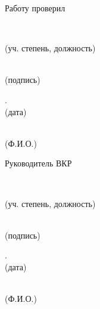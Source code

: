 \documentclass[14pt]{extarticle}
\begin{document}
\vspace{3em}
\noindent Работу проверил\\
\noindent
\makebox[0.0cm][l]{\underline{\hspace{\linewidth}}}%
\parbox[t]{5.4cm}{\\[-0.2em]%
{\centering\footnotesize (уч. степень, должность)\par}}%
\parbox[t]{4.0cm}{\centering \,\\[-0.2em] \footnotesize (подпись)\par}%
\parbox[t]{2.5cm}{.\the\year\\[-0.2em] \footnotesize (дата) \par}%
\parbox[t]{4.5cm}{\centering {}\\[-0.2em] \footnotesize (Ф.И.О.)\par}%

\vspace{3em}
\noindent Руководитель ВКР\\
\noindent
\makebox[0.0cm][l]{\underline{\hspace{\linewidth}}}%
\parbox[t]{5.4cm}{\\[-0.2em]%
{\centering\footnotesize (уч. степень, должность)\par}}%
\parbox[t]{4.0cm}{\, \\[-0.2em]\centering\footnotesize (подпись)\par}%
\parbox[t]{2.5cm}{.\the\year \\[-0.2em] \footnotesize (дата)\par}%
\parbox[t]{4.5cm}{\centering{}\\[-0.2em]\centering\footnotesize (Ф.И.О.)\par}%

\restoregeometry

\clearpage
\initpagenumbering
\setcounter{page}{4} %
\end{document}
